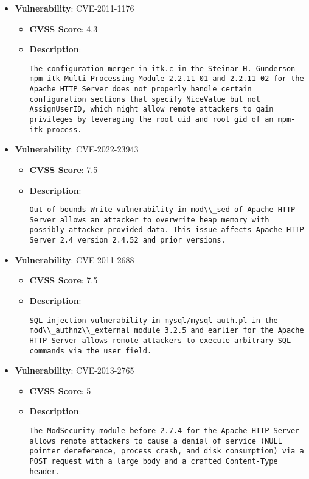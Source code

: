 \documentclass{article}
\begin{document}
\begin{itemize}
        \item \textbf{Vulnerability}: CVE-2011-1176
        \begin{itemize}
            \item \textbf{CVSS Score}:  4.3 
            \item \textbf{Description}:
            \parbox[t]{0.9\linewidth}{
                \verb|The configuration merger in itk.c in the Steinar H. Gunderson mpm-itk Multi-Processing Module 2.2.11-01 and 2.2.11-02 for the Apache HTTP Server does not properly handle certain configuration sections that specify NiceValue but not AssignUserID, which might allow remote attackers to gain privileges by leveraging the root uid and root gid of an mpm-itk process.|
            }
        \end{itemize}
    
        \item \textbf{Vulnerability}: CVE-2022-23943
        \begin{itemize}
            \item \textbf{CVSS Score}:  7.5 
            \item \textbf{Description}:
            \parbox[t]{0.9\linewidth}{
                \verb|Out-of-bounds Write vulnerability in mod\\_sed of Apache HTTP Server allows an attacker to overwrite heap memory with possibly attacker provided data. This issue affects Apache HTTP Server 2.4 version 2.4.52 and prior versions.|
            }
        \end{itemize}
    
        \item \textbf{Vulnerability}: CVE-2011-2688
        \begin{itemize}
            \item \textbf{CVSS Score}:  7.5 
            \item \textbf{Description}:
            \parbox[t]{0.9\linewidth}{
                \verb|SQL injection vulnerability in mysql/mysql-auth.pl in the mod\\_authnz\\_external module 3.2.5 and earlier for the Apache HTTP Server allows remote attackers to execute arbitrary SQL commands via the user field.|
            }
        \end{itemize}
    
        \item \textbf{Vulnerability}: CVE-2013-2765
        \begin{itemize}
            \item \textbf{CVSS Score}:  5 
            \item \textbf{Description}:
            \parbox[t]{0.9\linewidth}{
                \verb|The ModSecurity module before 2.7.4 for the Apache HTTP Server allows remote attackers to cause a denial of service (NULL pointer dereference, process crash, and disk consumption) via a POST request with a large body and a crafted Content-Type header.|
            }
        \end{itemize}
    

\end{itemize}
\end{document}
